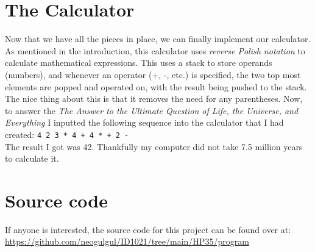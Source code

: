 \documentclass[a4paper, 11pt]{article}
\begin{document}
\section {The Calculator}
	Now that we have all the pieces in place, we can finally implement our calculator.
	As mentioned in the introduction, this calculator uses \textit{reverse Polish notation} to calculate mathematical expressions.
	This uses a stack to store operands (numbers), and whenever an operator (+, -, etc.) is specified, the two top most elements are popped and operated on,
	with the result being pushed to the stack.
	The nice thing about this is that it removes the need for any parentheses.
	Now, to answer the \textit{The Answer to the Ultimate Question of Life, the Universe, and Everything} I inputted the following sequence into the calculator that I had created:
	\texttt{4 2 3 * 4 + 4 * + 2 -}\\
	The result I got was 42.
	Thankfully my computer did not take 7.5 million years to calculate it.

\section {Source code}
	If anyone is interested, the source code for this project can be found over at: \url{https://github.com/neogulgul/ID1021/tree/main/HP35/program}
\end{document}
